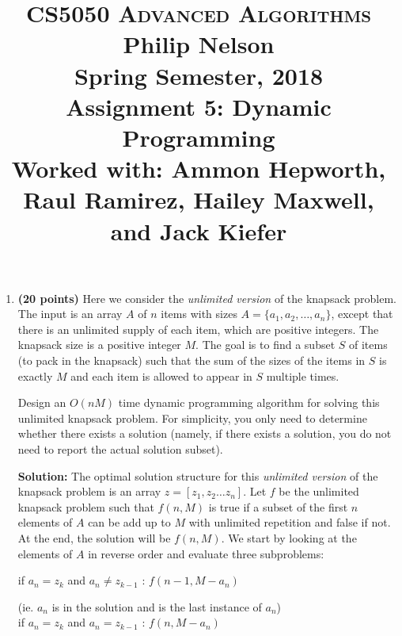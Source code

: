\documentclass[11pt]{article}
\begin{document}
\baselineskip=14.0pt

\title{CS5050 \textsc{Advanced Algorithms}
\\ {\bf Philip Nelson}
\\{\Large Spring Semester, 2018}
\\ Assignment 5: Dynamic Programming
\\ {\large Worked with: Ammon Hepworth, Raul Ramirez, Hailey Maxwell, and Jack Kiefer}}
\date{}

\maketitle

\vspace{-0.6in}

\begin{enumerate}

\item
{\bf (20 points)}
Here we consider the {\em unlimited version} of the knapsack problem. The
input is an array $A$ of $n$ items with sizes $A=\{a_1, a_2, \ldots,
a_n\}$, except that there is an unlimited supply of each item, which are positive integers.
The knapsack size is a positive integer $M$. The goal is to find a subset $S$ of items (to pack in the knapsack) such that the sum of the sizes of the items in $S$ is exactly $M$ and
each item is allowed to appear in $S$ multiple times.

Design an $O(nM)$ time dynamic programming algorithm for solving this unlimited
knapsack problem. For simplicity, you only need to determine whether
there exists a solution (namely, if
there exists a solution, you do not need to report the actual solution subset).

{\bf Solution:} The optimal solution structure for this {\em unlimited version} of the knapsack problem is an array $z=\left[ z_1, z_2\ldots z_n\right]$. Let $f$ be the unlimited knapsack problem such that $f(n, M)$ is true if a subset of the first $n$ elements of $A$ can be add up to $M$ with unlimited repetition and false if not. At the end, the solution will be $f(n, M)$. We start by looking at the elements of $A$ in reverse order and evaluate three subproblems:

if $a_n = z_k$ and $a_n \neq z_{k-1}$ : \hfill $f(n-1, M-a_n)$

(ie. $a_n$ is in the solution and is the last instance of $a_n$)\\

if $a_n = z_k$ and $a_n = z_{k-1}$ : \hfill $f(n, M-a_n)$


\end{enumerate}
\end{document}
